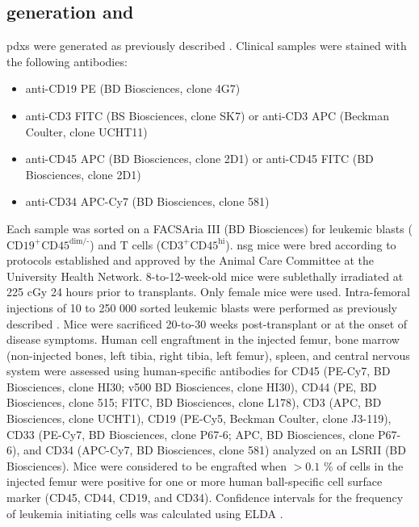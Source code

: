 \subsection{ generation and }

\Glspl{pdx} were generated as previously described \cite{dobsonRelapseFatedLatentDiagnosis2020}.
Clinical samples were stained with the following antibodies:

\begin{itemize}
  \item anti-CD19 PE (BD Biosciences, clone 4G7)
  \item anti-CD3 FITC (BS Biosciences, clone SK7) or anti-CD3 APC (Beckman Coulter, clone UCHT11)
  \item anti-CD45 APC (BD Biosciences, clone 2D1) or anti-CD45 FITC (BD Biosciences, clone 2D1)
  \item anti-CD34 APC-Cy7 (BD Biosciences, clone 581)
\end{itemize}

Each sample was sorted on a FACSAria III (BD Biosciences) for leukemic blasts ($\text{CD19}^+ \text{CD45}^{\text{dim/-}}$) and T cells ($\text{CD3}^+ \text{CD45}^{\text{hi}}$).
\Gls{nsg} mice were bred according to protocols established and approved by the Animal Care Committee at the University Health Network.
8-to-12-week-old mice were sublethally irradiated at 225 cGy 24 hours prior to transplants.
Only female mice were used.
Intra-femoral injections of 10 to 250 000 sorted leukemic blasts were performed as previously described \cite{mazurierRapidMyeloerythroidRepopulation2003}.
Mice were sacrificed 20-to-30 weeks post-transplant or at the onset of disease symptoms.
Human cell engraftment in the injected femur, bone marrow (non-injected bones, left tibia, right tibia, left femur), spleen, and central nervous system were assessed using human-specific antibodies for CD45 (PE-Cy7, BD Biosciences, clone HI30; v500 BD Biosciences, clone HI30), CD44 (PE, BD Biosciences, clone 515; FITC, BD Biosciences, clone L178), CD3 (APC, BD Biosciences, clone UCHT1), CD19 (PE-Cy5, Beckman Coulter, clone J3-119), CD33 (PE-Cy7, BD Biosciences, clone P67-6; APC, BD Biosciences, clone P67-6), and CD34 (APC-Cy7, BD Biosciences, clone 581) analyzed on an LSRII (BD Biosciences).
Mice were considered to be engrafted when $> 0.1$ \% of cells in the injected femur were positive for one or more human \gls{ball}-specific cell surface marker (CD45, CD44, CD19, and CD34).
Confidence intervals for the frequency of leukemia initiating cells was calculated using ELDA \cite{huELDAExtremeLimiting2009}.


